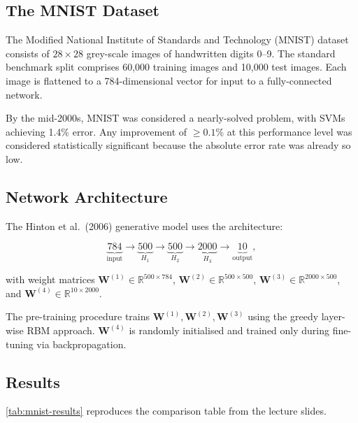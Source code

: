 \documentclass[12pt,a4paper]{article}
\newcommand{\W}{\mathbf{W}}
\begin{document}
\subsection{The MNIST Dataset}

The Modified National Institute of Standards and Technology (MNIST) dataset
consists of $28 \times 28$ grey-scale images of handwritten digits 0--9.
The standard benchmark split comprises 60,000 training images and 10,000 test
images.  Each image is flattened to a 784-dimensional vector for input to a
fully-connected network.

By the mid-2000s, MNIST was considered a nearly-solved problem, with SVMs
achieving 1.4\% error.  Any improvement of $\geq 0.1\%$ at this performance
level was considered statistically significant because the absolute error rate
was already so low.

\subsection{Network Architecture}

The Hinton et al.\ (2006) generative model uses the architecture:

\begin{equation}
  \underbrace{784}_{\text{input}} \to
  \underbrace{500}_{H_1} \to
  \underbrace{500}_{H_2} \to
  \underbrace{2000}_{H_3} \to
  \underbrace{10}_{\text{output}},
  \label{eq:mnist-arch}
\end{equation}

with weight matrices $\W^{(1)} \in \mathbb{R}^{500 \times 784}$,
$\W^{(2)} \in \mathbb{R}^{500 \times 500}$,
$\W^{(3)} \in \mathbb{R}^{2000 \times 500}$, and
$\W^{(4)} \in \mathbb{R}^{10 \times 2000}$.

The pre-training procedure trains $\W^{(1)}, \W^{(2)}, \W^{(3)}$ using the
greedy layer-wise RBM approach.  $\W^{(4)}$ is randomly initialised and
trained only during fine-tuning via backpropagation.

\subsection{Results}

\cref{tab:mnist-results} reproduces the comparison table from the lecture
slides.
\end{document}
